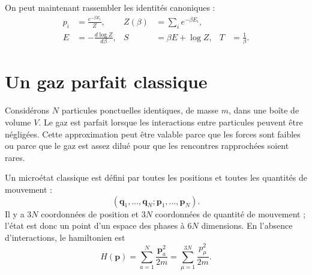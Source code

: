 \begin{classroomqa}
\end{classroomqa}

On peut maintenant rassembler les identités canoniques :
\begin{align}
 p_i&=\frac{e^{-\beta E_i}}{Z},&
 Z(\beta)&=\sum_i e^{-\beta E_i},\label{eq:sm4-canonical-pair}\\
 E&=-\frac{d\log Z}{d\beta},&
 S&=\beta E+\log Z,&
 T&=\frac{1}{\beta}.
 \label{eq:sm4-canonical-identities}
\end{align}

\section{Un gaz parfait classique}

Considérons \(N\) particules ponctuelles identiques, de masse \(m\), dans une boîte de volume \(V\). Le gaz est parfait lorsque les interactions entre particules peuvent être négligées. Cette approximation peut être valable parce que les forces sont faibles ou parce que le gaz est assez dilué pour que les rencontres rapprochées soient rares.

Un microétat classique est défini par toutes les positions et toutes les quantités de mouvement :
\begin{equation}
 (\bm q_1,\ldots,\bm q_N;\bm p_1,\ldots,\bm p_N).
\end{equation}
Il y a \(3N\) coordonnées de position et \(3N\) coordonnées de quantité de mouvement ; l’état est donc un point d’un espace des phases à \(6N\) dimensions. En l’absence d’interactions, le hamiltonien est
\begin{equation}
 H(\bm p)=\sum_{a=1}^{N}\frac{\bm p_a^2}{2m}
 =\sum_{\mu=1}^{3N}\frac{p_\mu^2}{2m}.
 \label{eq:sm4-ideal-hamiltonian}
\end{equation}

\begin{classroomqa}
\end{classroomqa}

